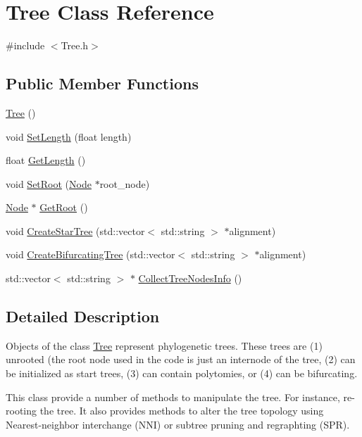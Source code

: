 \hypertarget{classTree}{}\section{Tree Class Reference}
\label{classTree}


{\ttfamily \#include $<$Tree.\+h$>$}

\subsection*{Public Member Functions}
\begin{DoxyCompactItemize}
\item 
\hyperlink{classTree_ad376a7c639d857312f5de2ef47482f68}{Tree} ()
\item 
void \hyperlink{classTree_aa16a8485326ce51d6d7324f23066eb27}{Set\+Length} (float length)
\item 
float \hyperlink{classTree_a5812392cfc9ed68d1fc3713d708a5e8f}{Get\+Length} ()
\item 
void \hyperlink{classTree_ae592faa2c1f2da3cc1157bd9a4b884b5}{Set\+Root} (\hyperlink{classNode}{Node} $\ast$root\+\_\+node)
\item 
\hyperlink{classNode}{Node} $\ast$ \hyperlink{classTree_a866593b4b067b38394a090e0d57b132f}{Get\+Root} ()
\item 
void \hyperlink{classTree_ac446f0f8211fcc033502690a9a164e95}{Create\+Star\+Tree} (std\+::vector$<$ std\+::string $>$ $\ast$alignment)
\item 
void \hyperlink{classTree_ac456dedd5e42bb0fea807aeb526e5a93}{Create\+Bifurcating\+Tree} (std\+::vector$<$ std\+::string $>$ $\ast$alignment)
\item 
std\+::vector$<$ std\+::string $>$ $\ast$ \hyperlink{classTree_a369b39fd2a571e0c4dfdadbdf4364c07}{Collect\+Tree\+Nodes\+Info} ()
\end{DoxyCompactItemize}


\subsection{Detailed Description}
Objects of the class \hyperlink{classTree}{Tree} represent phylogenetic trees. These trees are (1) unrooted (the root node used in the code is just an internode of the tree, (2) can be initialized as start trees, (3) can contain polytomies, or (4) can be bifurcating.

This class provide a number of methods to manipulate the tree. For instance, re-\/rooting the tree. It also provides methods to alter the tree topology using Nearest-\/neighbor interchange (N\+NI) or subtree pruning and regraphting (S\+PR).

